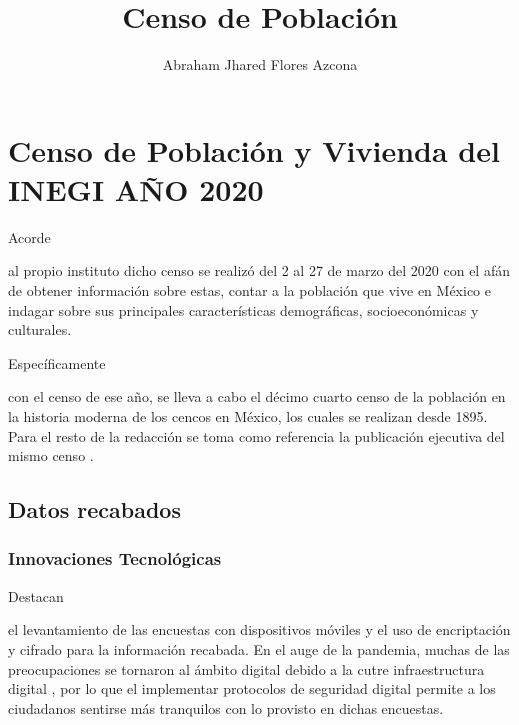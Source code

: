 \documentclass[stu, 12pt, letterpaper, donotrepeattitle, floatsintext, natbib]{apa7}
\title{\Large Censo de Población}
\author{Abraham Jhared Flores Azcona} %
\affiliation{Instituto Tecnológico de Tijuana}
\begin{document}
\maketitle


\renewcommand\contentsname{Contenido}
\tableofcontents

\newpage
\section{Censo de Población y Vivienda del INEGI AÑO 2020}
Acorde \begin{justifying}
  al propio instituto \citep{geografia-2020}%
  dicho censo se realizó del 2 al 27 de marzo del 2020 con el afán de obtener información sobre estas, contar a la población que vive en México
  e indagar sobre sus principales características demográficas, socioeconómicas y culturales.\par
\end{justifying}
Específicamente \begin{justifying}
  con el censo de ese año, se lleva a cabo el décimo cuarto censo de la población en la historia moderna de los cencos en México,
  los cuales se realizan desde 1895. Para el resto de la redacción se toma como referencia la publicación ejecutiva del mismo censo \citep{inegi-2020}. %
  \par
\end{justifying}
\vspace{\baselineskip}
\subsection{Datos recabados}
\subsubsection{Innovaciones Tecnológicas}
Destacan \begin{justifying}
  el levantamiento de las encuestas con dispositivos móviles y el uso de encriptación y cifrado para la información recabada. En el auge de la pandemia,
  muchas de las preocupaciones se tornaron al ámbito digital debido a la cutre infraestructura digital \citep{moore-2021}, por lo que el implementar protocolos de seguridad digital
  permite a los ciudadanos sentirse más tranquilos con lo provisto en dichas encuestas.\par
\end{justifying}
\vspace{\baselineskip}
\end{document}
